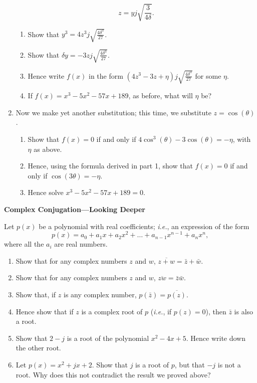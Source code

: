 \documentclass{article}
\begin{document}
\begin{enumerate}
	\[z=yj\sqrt{\frac{3}{4\delta}}.\]
		\begin{enumerate}
			\item Show that $y^3=4z^3j\sqrt{\frac{4\delta^3}{27}}$.
			\item Show that $\delta y=-3zj\sqrt{\frac{4\delta^3}{27}}$.
			\item Hence write $f(x)$ in the form $\left(4z^3-3z+\eta\right)j\sqrt{\frac{4\delta^3}{27}}$ for some $\eta$.
			\item If $f(x)=x^3-5x^2-57x+189$, as before, what will $\eta$ be?
		\end{enumerate}
	\item Now we make yet another substitution; this time, we substitute $z=\cos(\theta)$.
		\begin{enumerate}
			\item Show that $f(x)=0$ if and only if $4\cos^3(\theta)-3\cos(\theta)=-\eta$, with $\eta$ as above.
			\item Hence, using the formula derived in part 1, show that $f(x)=0$ if and only if $\cos(3\theta)=-\eta$.
			\item Hence solve $x^3-5x^2-57x+189=0$.
		\end{enumerate}
\end{enumerate}
\clearpage


\textbf{Complex Conjugation---Looking Deeper}

 Let $p(x)$ be a polynomial with real coefficients; \textit{i.e.}, an expression of the form
 \[p(x)=a_0+a_1x+a_2x^2+\hdots+a_{n-1}x^{n-1}+a_nx^n,\]
 where all the $a_i$ are real numbers.

\begin{enumerate}
	\item Show that for any complex numbers $z$ and $w$, $\overline{z+w}=\bar{z}+\bar{w}$.
	\item Show that for any complex numbers $z$ and $w$, $\overline{zw}=\bar{z}\bar{w}$.
	\item Show that, if $z$ is any complex number, $p(\bar{z})=\overline{p(z)}$.
	\item Hence show that if $z$ is a complex root of $p$ (\textit{i.e.}, if $p(z)=0$), then $\bar{z}$ is also a root.
	\item Show that $2-j$ is a root of the polynomial $x^2-4x+5$. Hence write down the other root.
	\item Let $p(x)=x^2+jx+2$. Show that $j$ is a root of $p$, but that $-j$ is not a root. Why does this not contradict the result we proved above?
\end{enumerate}
\end{document}
